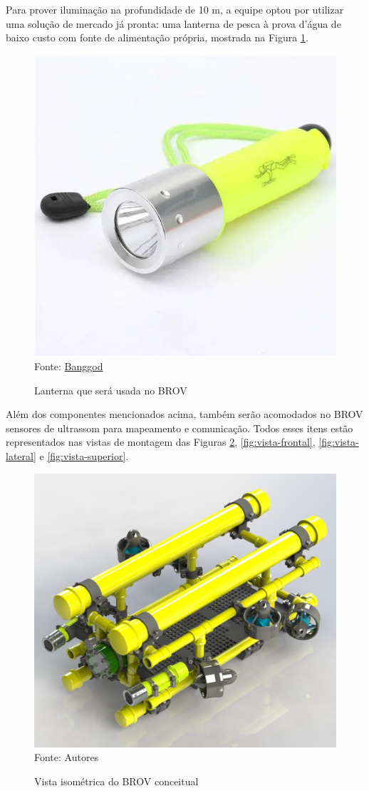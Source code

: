 Para prover iluminação na profundidade de 10 m, a equipe optou por utilizar uma solução de mercado já pronta: uma lanterna de pesca à prova d'água de baixo custo com fonte de alimentação própria, mostrada na Figura \ref{fig:lanterna}.

\begin{figure}[h]
	\centering
	\caption{Lanterna que será usada no BROV}
	\label{fig:lanterna}
	\includegraphics[width=0.4\linewidth]{images/lanterna}\\
	\footnotesize Fonte: \href{https://www.banggood.com/pt/Wholesale-Upgrade-2-T6-1600LM-3-Modes-Waterproof-LED-Flashlight-p-54536.html?imageAb=2&utm_campaign=3820755_54536&utm_content=3853&p=0101161305742201503R&cur_warehouse=CN&akmClientCountry=BR}{Banggod}
\end{figure}

Além dos componentes mencionados acima, também serão acomodados no BROV sensores de ultrassom para mapeamento e comunicação. Todos esses itens estão representados nas vistas de montagem das Figuras \ref{fig:vista-isometrica}, \ref{fig:vista-frontal}, \ref{fig:vista-lateral} e \ref{fig:vista-superior}.

\begin{figure}[h]
	\centering
	\caption{Vista isométrica do BROV conceitual}
	\label{fig:vista-isometrica}
	\includegraphics[width=0.7\linewidth]{images/vista-isometrica-cut}\\
	\footnotesize Fonte: Autores
\end{figure}

